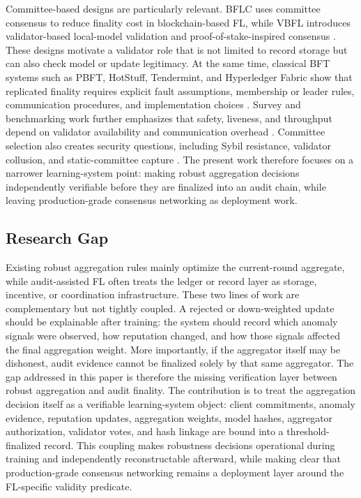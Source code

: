 \documentclass[preprint,12pt]{elsarticle}
\begin{document}
Committee-based designs are particularly relevant. BFLC uses committee consensus to reduce finality cost in blockchain-based FL, while VBFL introduces validator-based local-model validation and proof-of-stake-inspired consensus \citep{li2020bflc,chen2021vbfl}. These designs motivate a validator role that is not limited to record storage but can also check model or update legitimacy. At the same time, classical BFT systems such as PBFT, HotStuff, Tendermint, and Hyperledger Fabric show that replicated finality requires explicit fault assumptions, membership or leader rules, communication procedures, and implementation choices \citep{castro1999pbft,yin2019hotstuff,buchman2018tendermint,androulaki2018fabric}. Survey and benchmarking work further emphasizes that safety, liveness, and throughput depend on validator availability and communication overhead \citep{zhang2022bftsurvey,alqahtani2021bottlenecks}. Committee selection also creates security questions, including Sybil resistance, validator collusion, and static-committee capture \citep{rajab2020sybil}. The present work therefore focuses on a narrower learning-system point: making robust aggregation decisions independently verifiable before they are finalized into an audit chain, while leaving production-grade consensus networking as deployment work.

\subsection{Research Gap}

Existing robust aggregation rules mainly optimize the current-round aggregate, while audit-assisted FL often treats the ledger or record layer as storage, incentive, or coordination infrastructure. These two lines of work are complementary but not tightly coupled. A rejected or down-weighted update should be explainable after training: the system should record which anomaly signals were observed, how reputation changed, and how those signals affected the final aggregation weight. More importantly, if the aggregator itself may be dishonest, audit evidence cannot be finalized solely by that same aggregator. The gap addressed in this paper is therefore the missing verification layer between robust aggregation and audit finality. The contribution is to treat the aggregation decision itself as a verifiable learning-system object: client commitments, anomaly evidence, reputation updates, aggregation weights, model hashes, aggregator authorization, validator votes, and hash linkage are bound into a threshold-finalized record. This coupling makes robustness decisions operational during training and independently reconstructable afterward, while making clear that production-grade consensus networking remains a deployment layer around the FL-specific validity predicate.
\end{document}

